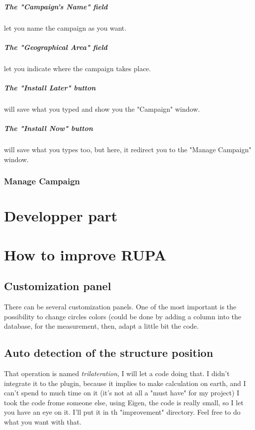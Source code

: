 \documentclass[11pt]{report}
\begin{document}
		    \paragraph{The "Campaign's Name" field} let you name the campaign as you want.
		    \paragraph{The "Geographical Area" field} let you indicate where the campaign takes place.
		    \paragraph{The "Install Later" button} will save what you typed and show you the "Campaign" window.
		    \paragraph{The "Install Now" button} will save what you types too, but here, it redirect you to the "Manage Campaign" window.

		\subsection{Manage Campaign}

	\chapter{Developper part}

	\chapter{How to improve RUPA}
	    \section{Customization panel}
		There can be several customization panels. One of the most important is the possibility to change circles
		colors (could be done by adding a column into the database, for the measurement, then, adapt a little bit the code.
	    
	    \section{Auto detection of the structure position}
		That operation is named \emph{trilateration}, I will let a code doing that. I didn't integrate it to the plugin, because 
		it implies to make calculation on earth, and I can't spend to much time on it (it's not at all a "must have" for my project)
		I took the code frome someone else, using Eigen, the code is really small, so I let you have an eye on it. I'll put it in
		th "improvement" directory. Feel free to do what you want with that.
\end{document}
